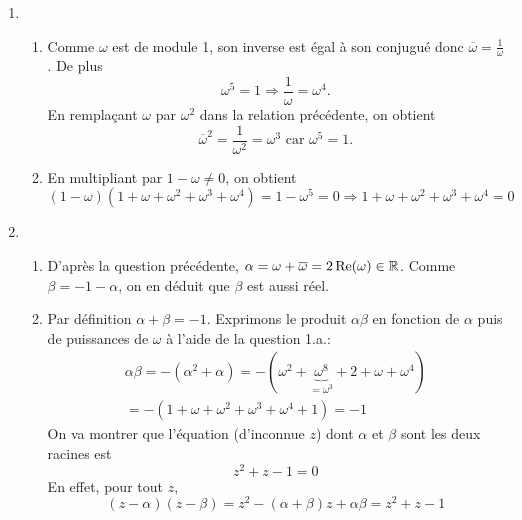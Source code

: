 \begin{enumerate}
 \item 
\begin{enumerate}
 \item Comme $\omega$ est de module 1, son inverse est égal à son conjugué donc $\overline{\omega} = \frac{1}{\omega}$. De plus
\begin{displaymath}
 \omega ^5 = 1 \Rightarrow \frac{1}{\omega} = \omega^4.
\end{displaymath}
En remplaçant $\omega$ par $\omega^2$ dans la relation précédente, on obtient
\begin{displaymath}
 \overline{\omega}^2 = \frac{1}{\omega^2} = \omega^3 \text{ car } \omega^5 = 1.
\end{displaymath}

 \item En multipliant par $1-\omega \neq 0$, on obtient
\begin{displaymath}
(1-\omega)(1+\omega+\omega^2+\omega^3+\omega^4)=1-\omega^5=0
\Rightarrow
1+\omega+\omega^2+\omega^3+\omega^4 = 0
\end{displaymath}
\end{enumerate}

\item 
\begin{enumerate}
  \item D'après la question précédente, $\alpha = \omega + \overline{\omega} = 2\operatorname{Re}(\omega) \in \mathbb{R}$. Comme $\beta = -1-\alpha$, on en déduit que $\beta$ est aussi réel.
  \item Par définition $\alpha + \beta = -1$. Exprimons le produit $\alpha \beta$ en fonction de $\alpha$ puis de puissances de $\omega$ à l'aide de la question 1.a.:
\begin{multline*}
 \alpha \beta = -\left( \alpha ^2 + \alpha \right)  
 = -\left( \omega^2 + \underset{=\omega^3}{\underbrace{\omega^8}} + 2 + \omega + \omega^4\right) \\
 = -\left( 1 + \omega + \omega^2 + \omega^3 + \omega^4 + 1  \right) = -1
\end{multline*}
On va montrer que l'équation (d'inconnue $z$) dont $\alpha$ et $\beta$ sont les deux racines est 
\begin{displaymath}
 z^2 + z -1 = 0
\end{displaymath}
En effet, pour tout $z$, 
\begin{displaymath}
 (z-\alpha)(z-\beta) = z^2 - (\alpha + \beta)z + \alpha \beta = z^2 + z -1
\end{displaymath}
\end{enumerate}


\end{enumerate}
